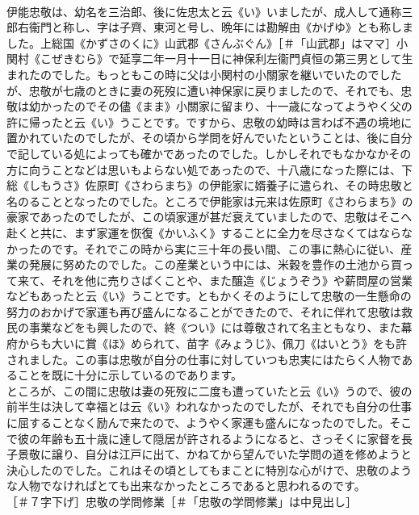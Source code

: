 \documentclass[8pt]{extreport}
\begin{document}
\begin{CJK}{UTF8}{min}
\\	伊能忠敬は、幼名を三治郎、後に佐忠太と云《い》いましたが、成人して通称三郎右衞門と称し、字は子齊、東河と号し、晩年には勘解由《かげゆ》とも称しました。上総国《かずさのくに》山武郡《さんぶぐん》［＃「山武郡」はママ］小関村《こぜきむら》で延享二年一月十一日に神保利左衞門貞恒の第三男として生まれたのでした。もっともこの時に父は小関村の小關家を継いでいたのでしたが、忠敬が七歳のときに妻の死歿に遭い神保家に戻りましたので、それでも、忠敬は幼かったのでその儘《まま》小關家に留まり、十一歳になってようやく父の許に帰ったと云《い》うことです。ですから、忠敬の幼時は言わば不遇の境地に置かれていたのでしたが、その頃から学問を好んでいたということは、後に自分で記している処によっても確かであったのでした。しかしそれでもなかなかその方に向うことなどは思いもよらない処であったので、十八歳になった際には、下総《しもうさ》佐原町《さわらまち》の伊能家に婿養子に遣られ、その時忠敬と名のることとなったのでした。ところで伊能家は元来は佐原町《さわらまち》の豪家であったのでしたが、この頃家運が甚だ衰えていましたので、忠敬はそこへ赴くと共に、まず家運を恢復《かいふく》することに全力を尽さなくてはならなかったのです。それでこの時から実に三十年の長い間、この事に熱心に従い、産業の発展に努めたのでした。この産業という中には、米穀を豊作の土池から買って来て、それを他に売りさばくことや、また醸造《じょうぞう》や薪問屋の営業などもあったと云《い》うことです。ともかくそのようにして忠敬の一生懸命の努力のおかげで家運も再び盛んになることができたので、それに伴れて忠敬は救民の事業などをも興したので、終《つい》には尊敬されて名主ともなり、また幕府からも大いに賞《ほ》められて、苗字《みょうじ》、佩刀《はいとう》をも許されました。この事は忠敬が自分の仕事に対していつも忠実にはたらく人物であることを既に十分に示しているのであります。
\\	ところが、この間に忠敬は妻の死歿に二度も遭っていたと云《い》うので、彼の前半生は決して幸福とは云《い》われなかったのでしたが、それでも自分の仕事に屈することなく励んで来たので、ようやく家運も盛んになったのでした。そこで彼の年齢も五十歳に達して隠居が許されるようになると、さっそくに家督を長子景敬に譲り、自分は江戸に出て、かねてから望んでいた学問の道を修めようと決心したのでした。これはその頃としてもまことに特別な心がけで、忠敬のような人物でなければとても出来なかったところであると思われるのです。
\\	［＃７字下げ］忠敬の学問修業［＃「忠敬の学問修業」は中見出し］

\end{CJK}
\end{document}
